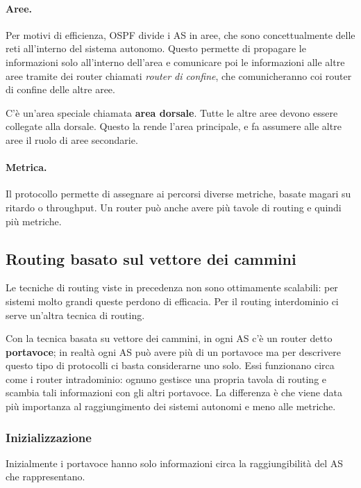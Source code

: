            \paragraph{Aree.} Per motivi di efficienza, OSPF divide i AS in aree, che sono concettualmente delle reti all'interno del sistema autonomo. Questo permette di propagare le informazioni solo all'interno dell'area e comunicare poi le informazioni alle altre aree tramite dei router chiamati \textit{router di confine}, che comunicheranno coi router di confine delle altre aree.
            
            C'è un'area speciale chiamata \textbf{area dorsale}. Tutte le altre aree devono essere collegate alla dorsale. Questo la rende l'area principale, e fa assumere alle altre aree il ruolo di aree secondarie.
            
            \paragraph{Metrica.} Il protocollo permette di assegnare ai percorsi diverse metriche, basate magari su ritardo o throughput. Un router può anche avere più tavole di routing e quindi più metriche.
            
    \subsection{Routing basato sul vettore dei cammini}
        Le tecniche di routing viste in precedenza non sono ottimamente scalabili: per sistemi molto grandi queste perdono di efficacia. Per il routing interdominio ci serve un'altra tecnica di routing. 
        
        Con la tecnica basata su vettore dei cammini, in ogni AS c'è un router detto \textbf{portavoce}; in realtà ogni AS può avere più di un portavoce ma per descrivere questo tipo di protocolli ci basta considerarne uno solo. Essi funzionano circa come i router intradominio: ognuno gestisce una propria tavola di routing e scambia tali informazioni con gli altri portavoce. La differenza è che viene data più importanza al raggiungimento dei sistemi autonomi e meno alle metriche.
        
        \subsubsection{Inizializzazione}
            Inizialmente i portavoce hanno solo informazioni circa la raggiungibilità del AS che rappresentano.
            
